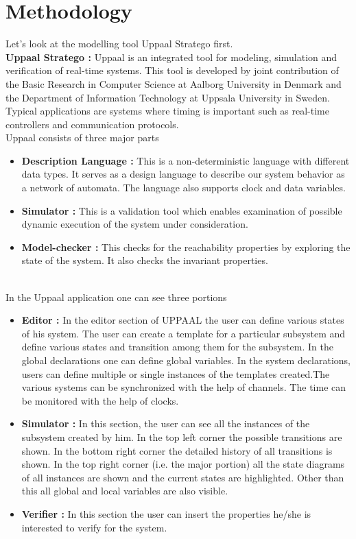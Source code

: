 \documentclass[conference]{IEEEtran}
\begin{document}
\section{Methodology}

Let’s look at the modelling tool Uppaal Stratego first.
\\

\noindent \textbf{Uppaal Stratego  :}
Uppaal is an integrated tool for modeling, simulation and verification of real-time systems. This tool is developed by joint contribution of the Basic Research in Computer Science at Aalborg University in Denmark and the Department of Information Technology at Uppsala University in Sweden. Typical applications are systems where timing is important such as real-time controllers and communication protocols.
\\

\noindent Uppaal consists of three major parts
\begin{itemize}
    \item \textbf{Description Language :} This is a non-deterministic language with different data types. It serves as a design language to describe our system behavior as a network of automata. The language also supports clock and data variables.
    \item \textbf{Simulator :} This is a validation tool which enables examination of possible dynamic execution of the system under consideration.
    \item \textbf{Model-checker :} This checks for the reachability properties by exploring the state of the system. It also checks the invariant properties.
\end{itemize}
\\

\noindent In the Uppaal application one can see three portions 
\begin{itemize}
    \item \textbf{Editor :} 
In the editor section of UPPAAL the user can define various states of his system. The user can create a template for a particular subsystem and define various states and transition among them for the subsystem. In the global declarations one can define global variables. In the system declarations, users can define multiple or single instances of the templates created.The various systems can be synchronized with the help of channels. The time can be monitored with the help of clocks.
\item \textbf{Simulator :} 
In this section, the user can see all the instances of the subsystem created by him.  In the top left corner the possible transitions are shown. In the bottom right corner the detailed history of all transitions is shown. In the top right corner (i.e. the major portion) all the state diagrams of all instances are shown and the current states are highlighted. Other than this all global and local variables are also visible.
\item \textbf{Verifier :} 
In this section the user can insert the properties he/she is interested to verify for the system.
\end{itemize}
\end{document}
